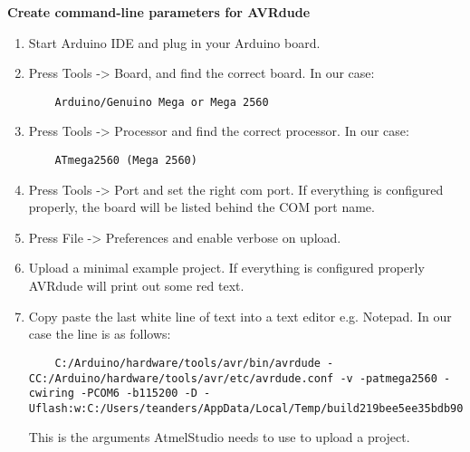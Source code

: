 \textbf{Create command-line parameters for AVRdude}
\begin{enumerate}
    \item Start Arduino IDE and plug in your Arduino board.
    \item Press Tools -> Board, and find the correct board. In our case:
    \begin{lstlisting}
    Arduino/Genuino Mega or Mega 2560
    \end{lstlisting}
    \item Press Tools -> Processor and find the correct processor. In our case:
    \begin{lstlisting}
    ATmega2560 (Mega 2560)
    \end{lstlisting}
    \item Press Tools -> Port and set the right com port. If everything is configured properly, the board will be listed behind the COM port name.
    \item Press File -> Preferences and enable verbose on upload.
    \item Upload a minimal example project. If everything is configured properly AVRdude will print out some red text.
    \item Copy paste the last white line of text into a text editor e.g. Notepad. In our case the line is as follows:
    \begin{lstlisting}
    C:/Arduino/hardware/tools/avr/bin/avrdude -CC:/Arduino/hardware/tools/avr/etc/avrdude.conf -v -patmega2560 -cwiring -PCOM6 -b115200 -D -Uflash:w:C:/Users/teanders/AppData/Local/Temp/build219bee5ee35bdb906c90832b67c0fe23.tmp/teste.ino.hex:i
    \end{lstlisting}
    This is the arguments AtmelStudio needs to use to upload a project.
\end{enumerate}
\newpage

